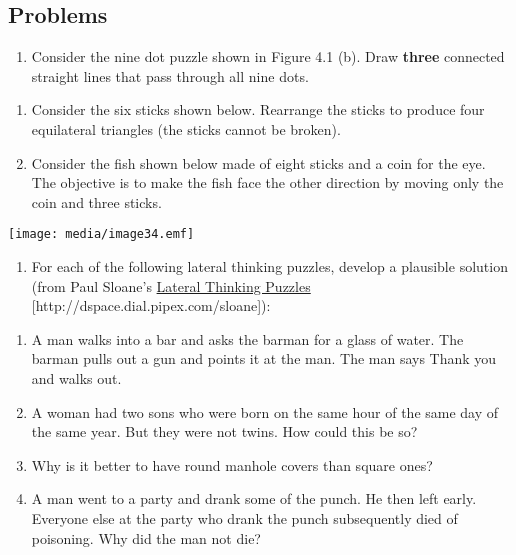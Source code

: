 \subsection{Problems}\label{problems}

\begin{enumerate}
\def\labelenumi{\arabic{enumi}.}
\item
  Consider the nine dot puzzle shown in Figure 4.1 (b). Draw
  \textbf{three} connected straight lines that pass through all nine
  dots.
\end{enumerate}

\begin{enumerate}
\def\labelenumi{\arabic{enumi}.}
\item
  Consider the six sticks shown below. Rearrange the sticks to produce
  four equilat­eral triangles (the sticks cannot be broken).
\item
  Consider the fish shown below made of eight sticks and a coin for the
  eye. The objective is to make the fish face the other direction by
  moving only the coin and three sticks.
\end{enumerate}

\texttt{[image: media/image34.emf]}

\begin{enumerate}
\def\labelenumi{\arabic{enumi}.}
\setcounter{enumi}{2}
\item
  For each of the following lateral thinking puzzles, develop a
  plausible solution (from Paul Sloane's \ul{Lateral Thinking Puzzles}
  {[}http://dspace.dial.pipex.com/sloane{]}):
\end{enumerate}

\begin{enumerate}
\def\labelenumi{\alph{enumi}.}
\item
  A man walks into a bar and asks the barman for a glass of water. The
  barman pulls out a gun and points it at the man. The man says
  \textquotesingle Thank you\textquotesingle{} and walks out.
\item
  A woman had two sons who were born on the same hour of the same day of
  the same year. But they were not twins. How could this be so?
\item
  Why is it better to have round manhole covers than square ones?
\item
  A man went to a party and drank some of the punch. He then left early.
  Everyone else at the party who drank the punch subsequently died of
  poisoning. Why did the man not die?
\end{enumerate}

